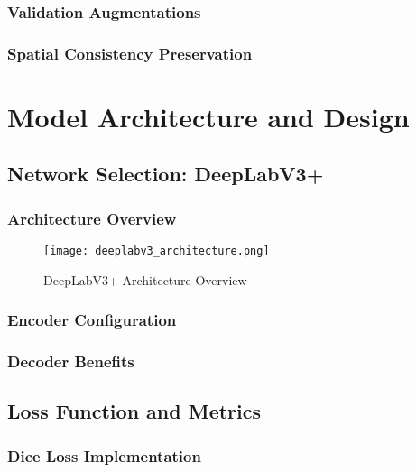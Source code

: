 \documentclass[12pt,a4paper]{report}
\begin{document}
\subsubsection{Validation Augmentations}

\subsubsection{Spatial Consistency Preservation}

\section{Model Architecture and Design}

\subsection{Network Selection: DeepLabV3+}

\subsubsection{Architecture Overview}

\begin{figure}[H]
\centering
\texttt{[image: deeplabv3\_architecture.png]}
\caption{DeepLabV3+ Architecture Overview}
\label{fig:deeplabv3}
\end{figure}

\subsubsection{Encoder Configuration}

\subsubsection{Decoder Benefits}

\subsection{Loss Function and Metrics}

\subsubsection{Dice Loss Implementation}
\end{document}
